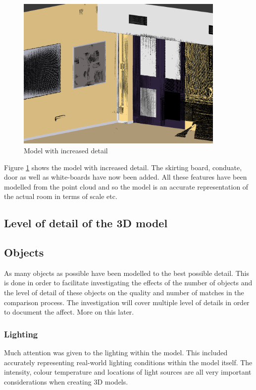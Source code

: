 \documentclass[11pt,a4paper]{report}
\begin{document}
				\begin{figure}[H]
					\centering
					\includegraphics[width=0.9\textwidth]{model_with_increased_detail}
					\caption{Model with increased detail}
					\label{fig:more_complex_model}
				\end{figure}
				
				Figure \ref{fig:more_complex_model} shows the model with increased detail. The skirting board, conduate, door as well as white-boards have now been added. All these features have been modelled from the point cloud and so the model is an accurate representation of the actual room in terms of scale etc.
				
		\subsection{Level of detail of the 3D model}
			\subsection{Objects}
				As many objects as possible have been modelled to the best possible detail. This is done in order to facilitate investigating the effects of the number of objects and the level of detail of these objects on the quality and number of matches in the comparison process. The investigation will cover multiple level of details in order to document the affect. More on this later.
			\subsubsection{Lighting}
				Much attention was given to the lighting within the model. This included accurately representing real-world lighting conditions within the model itself. The intensity, colour temperature and locations of light sources are all very important considerations when creating 3D models.
				
\end{document}
